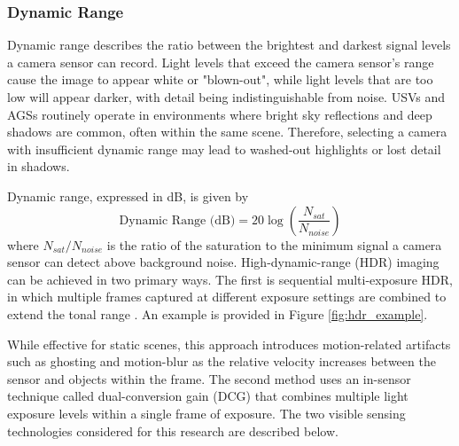 \documentclass{erauthesis}
\begin{document}
\subsubsection{Dynamic Range}
Dynamic range describes the ratio between the brightest and darkest signal levels a camera sensor can record.
Light levels that exceed the camera sensor's range cause the image to appear white or "blown-out", while light levels that are too low will appear darker, with detail being indistinguishable from noise.
\acp{USV} and \acp{AGS} routinely operate in environments where bright sky reflections and deep shadows are common, often within the same scene.
Therefore, selecting a camera with insufficient dynamic range may lead to washed-out highlights or lost detail in shadows.

Dynamic range, expressed in dB, is given by
\begin{equation}
 \text{Dynamic Range (dB)} = 20 \log{\left( \frac{N_{sat}}{N_{noise}}\right) }
\end{equation}
where $N_{sat}/N_{noise}$ is the ratio of the saturation to the minimum signal a camera sensor can detect above background noise.
High-dynamic-range (HDR) imaging can be achieved in two primary ways. 
The first is sequential multi-exposure \ac{HDR}, in which multiple frames captured at different exposure settings are combined to extend the tonal range \cite{Reinhard2010}. An example is provided in Figure \ref{fig:hdr_example}.



While effective for static scenes, this approach introduces motion-related artifacts such as ghosting and motion-blur as the relative velocity increases between the sensor and objects within the frame.
The second method uses an in-sensor technique called dual-conversion gain (DCG) that combines multiple light exposure levels within a single frame of exposure. 
The two visible sensing technologies considered for this research are described below.
\end{document}
